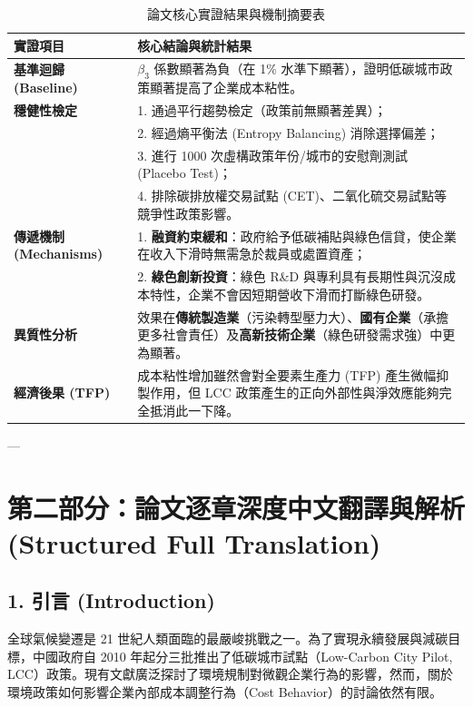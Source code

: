 \documentclass[11pt,a4paper]{article}
\begin{document}
\begin{table}[h]
\centering
\caption{論文核心實證結果與機制摘要表}
\label{tab:paper1_summary}
\small
\begin{tabularx}{\textwidth}{lX}
\toprule
\textbf{實證項目} & \textbf{核心結論與統計結果} \\
\midrule
\textbf{基準迴歸 (Baseline)} & $\beta_3$ 係數顯著為負（在 1\% 水準下顯著），證明低碳城市政策顯著提高了企業成本粘性。 \\
\textbf{穩健性檢定} & 1. 通過平行趨勢檢定（政策前無顯著差異）；\\
 & 2. 經過熵平衡法 (Entropy Balancing) 消除選擇偏差；\\
 & 3. 進行 1000 次虛構政策年份/城市的安慰劑測試 (Placebo Test)；\\
 & 4. 排除碳排放權交易試點 (CET)、二氧化硫交易試點等競爭性政策影響。 \\
\textbf{傳遞機制 (Mechanisms)} & 1. \textbf{融資約束緩和}：政府給予低碳補貼與綠色信貸，使企業在收入下滑時無需急於裁員或處置資產；\\
 & 2. \textbf{綠色創新投資}：綠色 R\&D 與專利具有長期性與沉沒成本特性，企業不會因短期營收下滑而打斷綠色研發。 \\
\textbf{異質性分析} & 效果在\textbf{傳統製造業}（污染轉型壓力大）、\textbf{國有企業}（承擔更多社會責任）及\textbf{高新技術企業}（綠色研發需求強）中更為顯著。 \\
\textbf{經濟後果 (TFP)} & 成本粘性增加雖然會對全要素生產力 (TFP) 產生微幅抑製作用，但 LCC 政策產生的正向外部性與淨效應能夠完全抵消此一下降。 \\
\bottomrule
\end{tabularx}
\end{table}

---

\section{第二部分：論文逐章深度中文翻譯與解析 (Structured Full Translation)}

\subsection{1. 引言 (Introduction)}
全球氣候變遷是 21 世紀人類面臨的最嚴峻挑戰之一。為了實現永續發展與減碳目標，中國政府自 2010 年起分三批推出了低碳城市試點（Low-Carbon City Pilot, LCC）政策。現有文獻廣泛探討了環境規制對微觀企業行為的影響，然而，關於環境政策如何影響企業內部成本調整行為（Cost Behavior）的討論依然有限。
\end{document}
